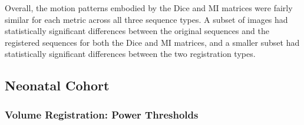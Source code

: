 
Overall, the motion patterns embodied by the Dice and MI matrices were fairly similar for each metric across all three sequence types. A subset of images had statistically significant differences between the original sequences and the registered sequences for both the Dice and MI matrices, and a smaller subset had statistically significant differences between the two registration types. 

\subsection{Neonatal Cohort}

\subsubsection{Volume Registration: Power Thresholds}

